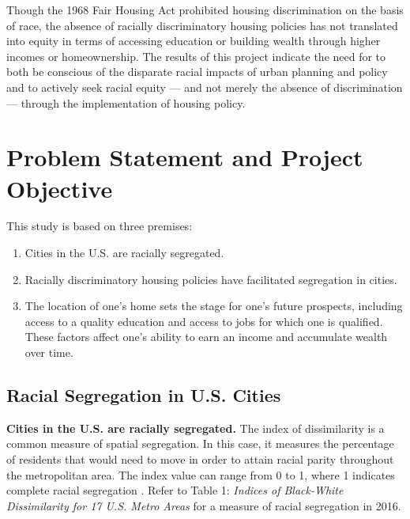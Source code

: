 \documentclass[paper=letter, fontsize=12pt]{scrartcl} %
\begin{document}
	Though the 1968 Fair Housing Act prohibited housing discrimination on the basis of race, the absence of racially discriminatory housing policies has not translated into equity in terms of accessing education or building wealth through higher incomes or homeownership. The results of this project indicate the need for to both be conscious of the disparate racial impacts of urban planning and policy and to actively seek racial equity --- and not merely the absence of discrimination --- through the implementation of housing policy.\par
	
	\section{Problem Statement and Project Objective}
	This study is based on three premises:
	\begin{enumerate}
		\item Cities in the U.S. are racially segregated.
		\item Racially discriminatory housing policies have facilitated segregation in cities.
		\item The location of one's home sets the stage for one's future prospects, including access to a quality education and access to jobs for which one is qualified. These factors affect one's ability to earn an income and accumulate wealth over time.
	\end{enumerate}
	
	\subsection{Racial Segregation in U.S. Cities}
	\textbf{Cities in the U.S. are racially segregated.} The index of dissimilarity is a common measure of spatial segregation. In this case, it measures the percentage of residents that would need to move in order to attain racial parity throughout the metropolitan area. The index value can range from 0 to 1, where 1 indicates complete racial segregation \cite{duncan}. Refer to Table 1: \textit{Indices of Black-White Dissimilarity for 17 U.S. Metro Areas} for a measure of racial segregation in 2016.\par
	
\end{document}
